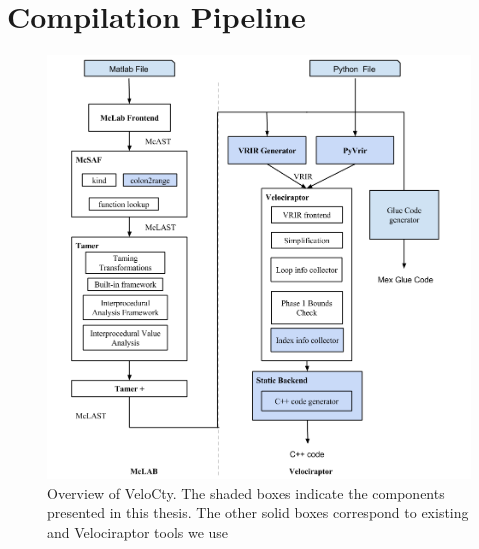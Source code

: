 \section{\velocty Compilation Pipeline}
\label{sec:comppipe}
\begin{figure}[htbp]
\begin{center}
\includegraphics[scale=0.5]{Figures/Overview_thesis.png}
\caption[Overview of the VeloCty]{Overview
of VeloCty. The shaded boxes indicate the components
presented in this thesis. The other solid boxes correspond to
existing \mclab and Velociraptor tools we use}\label{Fig:Overview}
\end{center}
\end{figure}
